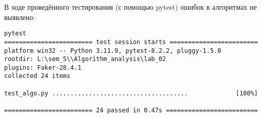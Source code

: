 В ходе проведённого тестирования (с помощью pytest) ошибок в алгоритмах не выявлено:

\vspace{0.25cm}
\begin{lstlisting}[caption=тестирование алгоритмов с помощью pytest]
pytest
======================== test session starts ========================
platform win32 -- Python 3.11.9, pytest-8.2.2, pluggy-1.5.0
rootdir: L:\sem_5\\Algorithm_analysis\lab_02
plugins: Faker-28.4.1
collected 24 items                                                                                                                                                                

test_algo.py .....................................             [100%]

======================== 24 passed in 0.47s =========================
\end{lstlisting}

\newpage